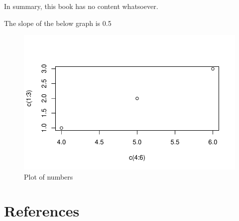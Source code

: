 \documentclass[
  12pt,
  letterpaper,
  DIV=11,
  numbers=noendperiod]{scrreprt}
\begin{document}
In summary, this book has no content whatsoever.

The slope of the below graph is 0.5

\begin{figure}

{\centering \includegraphics{summary_files/figure-pdf/fig-plot-1.pdf}

}

\caption{\label{fig-plot}Plot of numbers}

\end{figure}


\hypertarget{references}{%
\chapter*{References}\label{references}}

\end{document}
